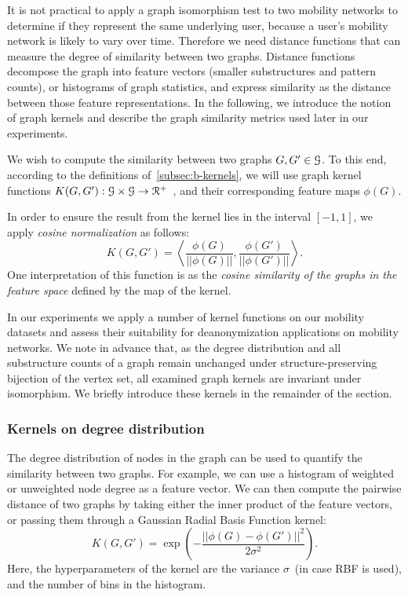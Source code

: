 It is not practical to apply a graph isomorphism test to two mobility networks to determine if they represent the same underlying user, because a user's mobility network is likely to vary over time.
Therefore we need distance functions that can measure the degree of similarity between two graphs.
Distance functions decompose the graph into feature vectors (smaller substructures and pattern counts), or histograms of graph statistics, and express similarity as the distance between those feature representations.
In the following, we introduce the notion of graph kernels and describe the graph similarity metrics used later in our experiments.

We wish to compute the similarity between two graphs $ G, G' \in \mathcal{G}$. 
To this end, according to the definitions of~\cref{subsec:b-kernels}, we will use graph kernel functions $ K(G, G') : \mathcal{G} \times \mathcal{G} \rightarrow \mathcal{R}^{+}$~\citep{Vishwanathan2010}, and their corresponding feature maps $\phi(G)$.


In order to ensure the result from the kernel lies in the interval $[-1, 1]$, we apply \emph{cosine normalization} as follows:
\[
K({G}, {G}')=\left  \langle \frac{\phi({G})}{||\phi({G})||}, \frac{\phi(G')}{||\phi(G')||} \right  \rangle.
\]
One interpretation of this function is as the \emph{cosine similarity of the graphs in the feature space} defined by the map of the kernel.

In our experiments we apply a number of kernel functions on our mobility datasets and assess their suitability for deanonymization applications on mobility networks.
We note in advance that, as the degree distribution and all substructure counts of a graph remain unchanged under structure-preserving bijection of the vertex set, all examined graph kernels are invariant under isomorphism.
We briefly introduce these kernels in the remainder of the section.


\subsubsection{Kernels on degree distribution }

The degree distribution of nodes in the graph can be used to quantify the similarity between two graphs.
For example, we can use a histogram of weighted or unweighted node degree as a feature vector.
We can then compute the pairwise distance of two graphs by taking either the inner product of the feature vectors, or passing them through a Gaussian Radial Basis Function kernel:
\[ K(G,G') =\exp\left( -\frac{||\phi(G) - \phi(G')||^2}{2\sigma^2} \right).\]
Here, the hyperparameters of the kernel are the variance $\sigma$~(in case RBF is used), and the number of bins in the histogram.

